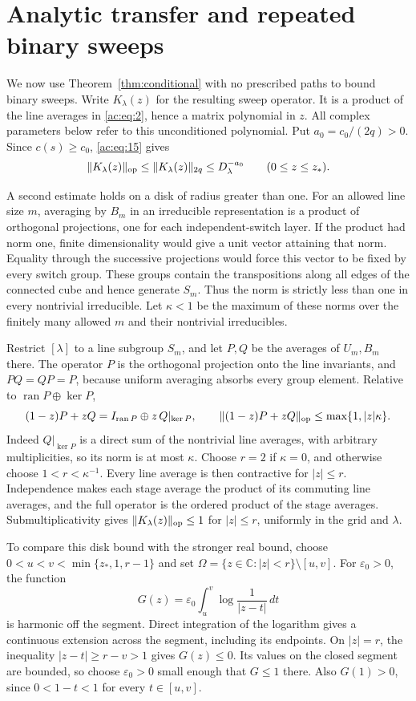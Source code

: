 \section{Analytic transfer and repeated binary sweeps}\label{sec:analytic}
\label{ac:part:278}

We now use Theorem~\ref{thm:conditional} with no prescribed paths to bound binary sweeps. Write \(K_\lambda(z)\) for the resulting sweep operator. It is a product of the line averages in \eqref{ac:eq:2}, hence a matrix polynomial in \(z\). All complex parameters below refer to this unconditioned polynomial. Put \(a_0=c_0/(2q)>0\). Since \(c(s)\ge c_0\), \eqref{ac:eq:15} gives
\[
 \|K_\lambda(z)\|_{\mathrm{op}}\le \|K_\lambda(z)\|_{2q}
       \le D_\lambda^{-a_0}\qquad(0\le z\le z_*).
\]

A second estimate holds on a disk of radius greater than one. For an allowed line size \(m\), averaging by \(B_m\) in an irreducible representation is a product of orthogonal projections, one for each independent-switch layer. If the product had norm one, finite dimensionality would give a unit vector attaining that norm. Equality through the successive projections would force this vector to be fixed by every switch group. These groups contain the transpositions along all edges of the connected cube and hence generate \(S_m\). Thus the norm is strictly less than one in every nontrivial irreducible. Let \(\kappa<1\) be the maximum of these norms over the finitely many allowed \(m\) and their nontrivial irreducibles.

Restrict \([\lambda]\) to a line subgroup \(S_m\), and let \(P,Q\) be the averages of \(U_m,B_m\) there. The operator \(P\) is the orthogonal projection onto the line invariants, and \(PQ=QP=P\), because uniform averaging absorbs every group element. Relative to \(\operatorname{ran}P\oplus\ker P\),
\[
 (1-z)P+zQ=I_{\operatorname{ran}P}\oplus z\,Q|_{\ker P},
 \qquad
 \|(1-z)P+zQ\|_{\mathrm{op}}\le\max\{1,|z|\kappa\}.
\]
Indeed \(Q|_{\ker P}\) is a direct sum of the nontrivial line averages, with arbitrary multiplicities, so its norm is at most \(\kappa\). Choose \(r=2\) if \(\kappa=0\), and otherwise choose \(1<r<\kappa^{-1}\). Every line average is then contractive for \(|z|\le r\). Independence makes each stage average the product of its commuting line averages, and the full operator is the ordered product of the stage averages. Submultiplicativity gives \(\|K_\lambda(z)\|_{\mathrm{op}}\le1\) for \(|z|\le r\), uniformly in the grid and \(\lambda\).

To compare this disk bound with the stronger real bound, choose
\(0<u<v<\min\{z_*,1,r-1\}\) and set
\(\Omega=\{z\in\mathbb C:|z|<r\}\setminus[u,v]\). For \(\varepsilon_0>0\), the function
\[
 G(z)=\varepsilon_0\int_u^v\log\frac1{|z-t|}\,dt
\]
is harmonic off the segment. Direct integration of the logarithm gives a continuous extension across the segment, including its endpoints. On \(|z|=r\), the inequality \(|z-t|\ge r-v>1\) gives \(G(z)\le0\). Its values on the closed segment are bounded, so choose \(\varepsilon_0>0\) small enough that \(G\le1\) there. Also \(G(1)>0\), since \(0<1-t<1\) for every \(t\in[u,v]\).

